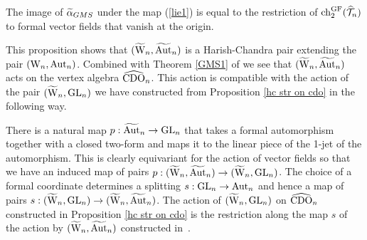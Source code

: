 \begin{prop} 
The image of $\Tilde{\alpha}_{GMS}$ under the map (\ref{lie1}) is equal to 
the restriction of $\ch_2^{\rm GF}(\hT_n)$ to formal vector fields that vanish at the origin. 
\end{prop}

This proposition shows that $(\TVect, \Tilde{\rm Aut}_n)$ is a Harish-Chandra
pair extending the pair $(\Vect, \Aut_n)$. Combined with Theorem
\ref{GMS1} of \cite{GMS} we see that $(\TVect, \Tilde{\Aut}_n)$ acts on the vertex algebra
$\hCDO_n$. This action is compatible with the action of the pair
$(\TVect, \GL_n)$ we have constructed from Proposition \ref{hc str on cdo} in the following way. 

There is a natural map $p : \Tilde{\Aut}_n \to \GL_n$ that takes a formal automorphism together with a closed two-form and
maps it to the linear piece of the 1-jet of the automorphism. This is
clearly equivariant for the action of vector fields so that we have an
induced map of pairs $p : (\TVect, \TAut_n) \to (\TVect, \GL_n)$. 
The choice of a formal coordinate determines a splitting $s : \GL_n \to \Aut_n$ and hence a map of pairs 
$s : (\TVect, \GL_n)\to (\TVect, \TAut_n)$.
The action of $(\TVect, \GL_n)$ on $\hCDO_n$ constructed in
Proposition \ref{hc str on cdo} is the restriction along the map $s$ of the action by
$(\TVect, \TAut_n)$ constructed in~\cite{GMS}. 




